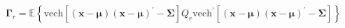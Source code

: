 \begin{equation}
	\boldsymbol{\Gamma}_{r}
	=
	\mathbb{E}
	\left\{
	\mathrm{vech}
	\left[
		\left(
		\mathbf{x}
		-
		\boldsymbol{\mu}
		\right)
		\left(
		\mathbf{x}
		-
		\boldsymbol{\mu}
		\right)^{\prime}
		-
		\boldsymbol{\Sigma}
	\right]
	Q_{r}
	\mathrm{vech}^{\prime}
	\left[
		\left(
		\mathbf{x}
		-
		\boldsymbol{\mu}
		\right)
		\left(
		\mathbf{x}
		-
		\boldsymbol{\mu}
		\right)^{\prime}
		-
		\boldsymbol{\Sigma}
	\right]
	\right\}
\end{equation}